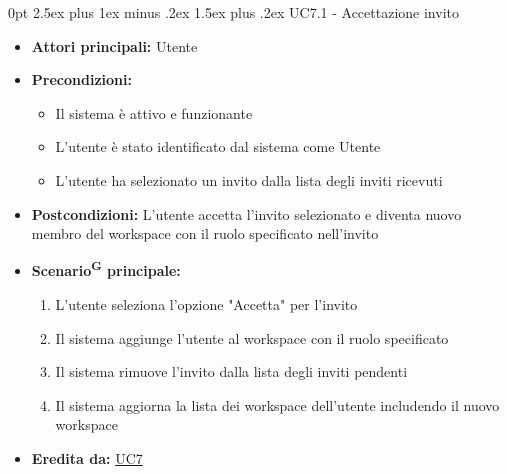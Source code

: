 \documentclass[a4paper, 11pt]{article}
\makeatletter
\renewcommand\paragraph{\@startsection{paragraph}{4}
  {0pt}
  {2.5ex plus 1ex minus .2ex}
  {1.5ex plus .2ex}
  {\normalfont\normalsize\bfseries\color{AccentDark}}}
\makeatother
\begin{document}
\paragraph{UC7.1 - Accettazione invito}\label{UC7.1}
\begin{itemize}
	\item \textbf{Attori principali:} Utente
	\item \textbf{Precondizioni:} 
	\begin{itemize}
		\item Il sistema è attivo e funzionante
		\item L'utente è stato identificato dal sistema come Utente
        \item L'utente ha selezionato un invito dalla lista degli inviti ricevuti
	\end{itemize}
    \item \textbf{Postcondizioni:} L'utente accetta l'invito selezionato e diventa nuovo membro del workspace con il ruolo specificato nell'invito
	\item \textbf{Scenario\textsuperscript{G} principale:}
    \begin{enumerate}
        \item L'utente seleziona l'opzione "Accetta" per l'invito
        \item Il sistema aggiunge l'utente al workspace con il ruolo specificato
        \item Il sistema rimuove l'invito dalla lista degli inviti pendenti
        \item Il sistema aggiorna la lista dei workspace dell'utente includendo il nuovo workspace
    \end{enumerate}
    \item \textbf{Eredita da:} \hyperref[UC7]{UC7}
\end{itemize}
\end{document}
